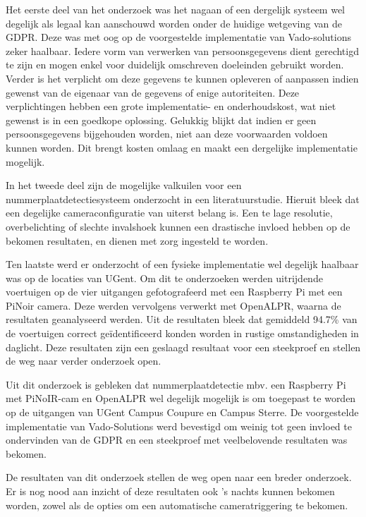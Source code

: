 Het eerste deel van het onderzoek was het nagaan of een dergelijk systeem wel degelijk als legaal kan aanschouwd worden onder de huidige wetgeving van de GDPR. Deze was met oog op de voorgestelde implementatie van Vado-solutions zeker haalbaar. Iedere vorm van verwerken van persoonsgegevens dient gerechtigd te zijn en mogen enkel voor duidelijk omschreven doeleinden gebruikt worden. Verder is het verplicht om deze gegevens te kunnen opleveren of aanpassen indien gewenst van de eigenaar van de gegevens of enige autoriteiten. Deze verplichtingen hebben een grote implementatie- en onderhoudskost, wat niet gewenst is in een goedkope oplossing. Gelukkig blijkt dat indien er geen persoonsgegevens bijgehouden worden, niet aan deze voorwaarden voldoen kunnen worden. Dit brengt kosten omlaag en maakt een dergelijke implementatie mogelijk.

In het tweede deel zijn de mogelijke valkuilen voor een nummerplaatdetectiesysteem onderzocht in een literatuurstudie. Hieruit bleek dat een degelijke cameraconfiguratie van uiterst belang is. Een te lage resolutie, overbelichting of slechte invalshoek kunnen een drastische invloed hebben op de bekomen resultaten, en dienen met zorg ingesteld te worden.

Ten laatste werd er onderzocht of een fysieke implementatie wel degelijk haalbaar was op de locaties van UGent. Om dit te onderzoeken werden uitrijdende voertuigen op de vier uitgangen gefotografeerd met een Raspberry Pi met een PiNoir camera. Deze werden vervolgens verwerkt met OpenALPR, waarna de resultaten geanalyseerd werden. Uit de resultaten bleek dat gemiddeld 94.7\% van de voertuigen correct geïdentificeerd konden worden in rustige omstandigheden in daglicht. Deze resultaten zijn een geslaagd resultaat voor een steekproef en stellen de weg naar verder onderzoek open.

Uit dit onderzoek is gebleken dat nummerplaatdetectie mbv. een Raspberry Pi met PiNoIR-cam en OpenALPR wel degelijk mogelijk is om toegepast te worden op de uitgangen van UGent Campus Coupure en Campus Sterre. De voorgestelde implementatie van Vado-Solutions werd bevestigd om weinig tot geen invloed te ondervinden van de GDPR en een steekproef met veelbelovende resultaten was bekomen.

De resultaten van dit onderzoek stellen de weg open naar een breder onderzoek. Er is nog nood aan inzicht of deze resultaten ook 's nachts kunnen bekomen worden, zowel als de opties om een automatische cameratriggering te bekomen.
